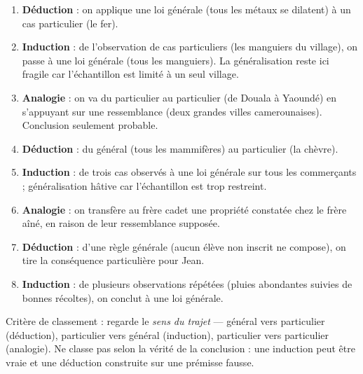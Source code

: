 \documentclass[11pt]{article}
\begin{document}
\begin{corrige}
\begin{enumerate}
\item \textbf{Déduction} : on applique une loi générale (tous les métaux se dilatent) à un cas particulier (le fer).
\item \textbf{Induction} : de l'observation de cas particuliers (les manguiers du village), on passe à une loi générale (tous les manguiers). La généralisation reste ici fragile car l'échantillon est limité à un seul village.
\item \textbf{Analogie} : on va du particulier au particulier (de Douala à Yaoundé) en s'appuyant sur une ressemblance (deux grandes villes camerounaises). Conclusion seulement probable.
\item \textbf{Déduction} : du général (tous les mammifères) au particulier (la chèvre).
\item \textbf{Induction} : de trois cas observés à une loi générale sur tous les commerçants ; généralisation hâtive car l'échantillon est trop restreint.
\item \textbf{Analogie} : on transfère au frère cadet une propriété constatée chez le frère aîné, en raison de leur ressemblance supposée.
\item \textbf{Déduction} : d'une règle générale (aucun élève non inscrit ne compose), on tire la conséquence particulière pour Jean.
\item \textbf{Induction} : de plusieurs observations répétées (pluies abondantes suivies de bonnes récoltes), on conclut à une loi générale.
\end{enumerate}
\end{corrige}

\begin{attention}
Critère de classement : regarde le \emph{sens du trajet} — général vers particulier (déduction), particulier vers général (induction), particulier vers particulier (analogie). Ne classe pas selon la vérité de la conclusion : une induction peut être vraie et une déduction construite sur une prémisse fausse.
\end{attention}
\end{document}
